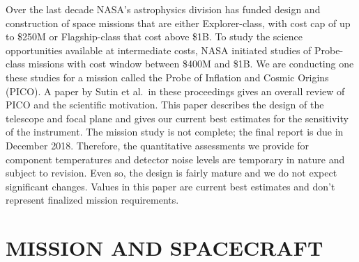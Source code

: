 \documentclass[]{spie}  %
\begin{document}
Over the last decade NASA's astrophysics division has funded design and construction of space missions that are either Explorer-class, 
with cost cap of up to \$250M or Flagship-class that cost above \$1B. 
To study the science opportunities available at intermediate costs, NASA initiated studies of Probe-class missions with cost window 
between \$400M and \$1B.  We are conducting one these studies for a mission called the Probe of Inflation and Cosmic Origins (PICO). 
A paper by Sutin et al.\cite{brian_spie}\ in these proceedings gives an overall review of PICO and the scientific motivation.  
This paper describes the design of the telescope and focal plane and gives 
our current best estimates for the sensitivity of the instrument. The mission study is not complete; the final report 
is due in December 2018. Therefore, the quantitative assessments we provide for component temperatures and detector
noise levels are temporary in nature and subject to revision. 
Even so, the design is fairly mature and we do not expect significant changes. 
Values in this paper are current best estimates and don't represent finalized mission requirements. 


\section{MISSION AND SPACECRAFT}
\label{sec:spacecraft}
\end{document}
